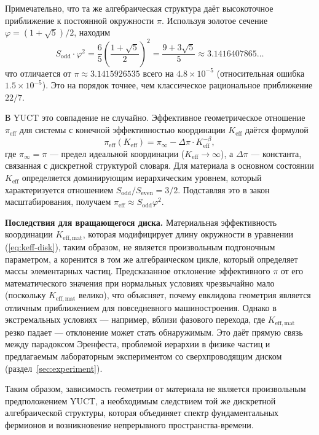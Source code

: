 \documentclass[12pt,a4paper]{article}
\begin{document}
	Примечательно, что та же алгебраическая структура даёт высокоточное приближение к постоянной окружности \(\pi\). Используя золотое сечение \(\varphi = (1+\sqrt{5})/2\), находим
	\begin{equation}
		S_{\mathrm{odd}} \cdot \varphi^2 = \frac{6}{5} \left( \frac{1+\sqrt{5}}{2} \right)^2 
		= \frac{9+3\sqrt{5}}{5} \approx 3.1416407865\dots
	\end{equation}
	что отличается от \(\pi \approx 3.1415926535\) всего на \(4.8\times10^{-5}\) (относительная ошибка \(1.5\times10^{-5}\)). Это на порядок точнее, чем классическое рациональное приближение \(22/7\).
	
	В YUCT это совпадение не случайно. Эффективное геометрическое отношение \(\pi_{\mathrm{eff}}\) для системы с конечной эффективностью координации \(K_{\mathrm{eff}}\) даётся формулой
	\begin{equation}
		\pi_{\mathrm{eff}}(K_{\mathrm{eff}}) = \pi_{\infty} - \Delta\pi \cdot K_{\mathrm{eff}}^{-\beta},
	\end{equation}
	где \(\pi_{\infty} = \pi\) — предел идеальной координации (\(K_{\mathrm{eff}} \to \infty\)), а \(\Delta\pi\) — константа, связанная с дискретной структурой словаря. Для материала в основном состоянии \(K_{\mathrm{eff}}\) определяется доминирующим иерархическим уровнем, который характеризуется отношением \(S_{\mathrm{odd}}/S_{\mathrm{even}} = 3/2\). Подставляя это в закон масштабирования, получаем \(\pi_{\mathrm{eff}} \approx S_{\mathrm{odd}}\varphi^2\).
	
	\textbf{Последствия для вращающегося диска.} Материальная эффективность координации \(K_{\mathrm{eff,mat}}\), которая модифицирует длину окружности в уравнении (\ref{eq:keff-disk}), таким образом, не является произвольным подгоночным параметром, а коренится в том же алгебраическом цикле, который определяет массы элементарных частиц. Предсказанное отклонение эффективного \(\pi\) от его математического значения при нормальных условиях чрезвычайно мало (поскольку \(K_{\mathrm{eff,mat}}\) велико), что объясняет, почему евклидова геометрия является отличным приближением для повседневного машиностроения. Однако в экстремальных условиях — например, вблизи фазового перехода, где \(K_{\mathrm{eff,mat}}\) резко падает — отклонение может стать обнаружимым. Это даёт прямую связь между парадоксом Эренфеста, проблемой иерархии в физике частиц и предлагаемым лабораторным экспериментом со сверхпроводящим диском (раздел~\ref{sec:experiment}).
	
	Таким образом, зависимость геометрии от материала не является произвольным предположением YUCT, а необходимым следствием той же дискретной алгебраической структуры, которая объединяет спектр фундаментальных фермионов и возникновение непрерывного пространства-времени.
	
\end{document}
